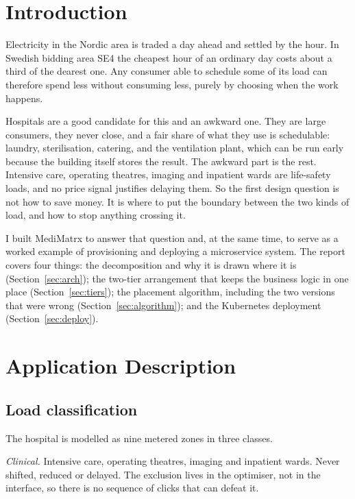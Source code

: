 \documentclass[conference]{IEEEtran}
\begin{document}
\section{Introduction}

Electricity in the Nordic area is traded a day ahead and settled by the hour. In
Swedish bidding area SE4 the cheapest hour of an ordinary day costs about a
third of the dearest one. Any consumer able to schedule some of its load can
therefore spend less without consuming less, purely by choosing when the work
happens.

Hospitals are a good candidate for this and an awkward one. They are large
consumers, they never close, and a fair share of what they use is schedulable:
laundry, sterilisation, catering, and the ventilation plant, which can be run
early because the building itself stores the result. The awkward part is the
rest. Intensive care, operating theatres, imaging and inpatient wards are
life-safety loads, and no price signal justifies delaying them. So the first
design question is not how to save money. It is where to put the boundary
between the two kinds of load, and how to stop anything crossing it.

I built MediMatrx to answer that question and, at the same time, to serve as a
worked example of provisioning and deploying a microservice system. The report
covers four things: the decomposition and why it is drawn where it is
(Section~\ref{sec:arch}); the two-tier arrangement that keeps the business logic
in one place (Section~\ref{sec:tiers}); the placement algorithm, including the
two versions that were wrong (Section~\ref{sec:algorithm}); and the Kubernetes
deployment (Section~\ref{sec:deploy}).

\section{Application Description}

\subsection{Load classification}

The hospital is modelled as nine metered zones in three classes.

\emph{Clinical.} Intensive care, operating theatres, imaging and inpatient
wards. Never shifted, reduced or delayed. The exclusion lives in the optimiser,
not in the interface, so there is no sequence of clicks that can defeat it.
\end{document}
